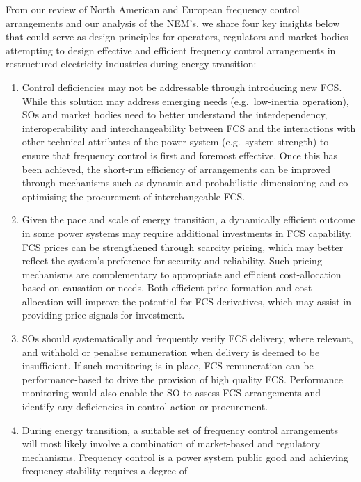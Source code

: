 \documentclass[12pt,a4paper,]{report}
\begin{document}
From our review of North American and European frequency control
arrangements and our analysis of the NEM's, we share four key insights
below that could serve as design principles for operators, regulators
and market-bodies attempting to design effective and efficient frequency
control arrangements in restructured electricity industries during
energy transition:

\begin{enumerate}
\def\labelenumi{\arabic{enumi}.}
\item
  Control deficiencies may not be addressable through introducing new
  FCS. While this solution may address emerging needs (e.g.~low-inertia
  operation), SOs and market bodies need to better understand the
  interdependency, interoperability and interchangeability between FCS
  and the interactions with other technical attributes of the power
  system (e.g.~system strength) to ensure that frequency control is
  first and foremost effective. Once this has been achieved, the
  short-run efficiency of arrangements can be improved through
  mechanisms such as dynamic and probabilistic dimensioning and
  co-optimising the procurement of interchangeable FCS.
\item
  Given the pace and scale of energy transition, a dynamically efficient
  outcome in some power systems may require additional investments in
  FCS capability. FCS prices can be strengthened through scarcity
  pricing, which may better reflect the system's preference for security
  and reliability. Such pricing mechanisms are complementary to
  appropriate and efficient cost-allocation based on causation or needs.
  Both efficient price formation and cost-allocation will improve the
  potential for FCS derivatives, which may assist in providing price
  signals for investment.
\item
  SOs should systematically and frequently verify FCS delivery, where
  relevant, and withhold or penalise remuneration when delivery is
  deemed to be insufficient. If such monitoring is in place, FCS
  remuneration can be performance-based to drive the provision of high
  quality FCS. Performance monitoring would also enable the SO to assess
  FCS arrangements and identify any deficiencies in control action or
  procurement.
\item
  During energy transition, a suitable set of frequency control
  arrangements will most likely involve a combination of market-based
  and regulatory mechanisms. Frequency control is a power system public
  good and achieving frequency stability requires a degree of

\end{enumerate}
\end{document}
